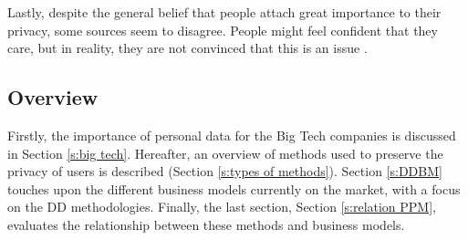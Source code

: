 Lastly, despite the general belief that people attach great importance to their privacy, some sources seem to disagree.
People might feel confident that they care, but in reality, they are not convinced that this is an issue \cite{Dinev2014}.

\subsection{Overview}
Firstly, the importance of personal data for the Big Tech companies is discussed in Section \ref{s:big tech}. 
Hereafter, an overview of methods used to preserve the privacy of users is described (Section \ref{s:types of methods}).
Section \ref{s:DDBM} touches upon the different business models currently on the market, with a focus on the \gls{DD} methodologies.
Finally, the last section, Section \ref{s:relation PPM}, evaluates the relationship between these methods and business models.
